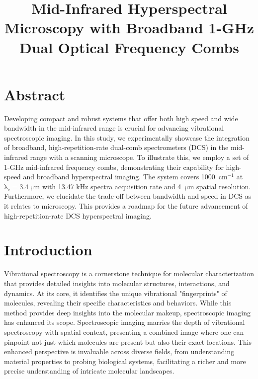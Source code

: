 \documentclass{optica-article}
\begin{document}
\title{Mid-Infrared Hyperspectral Microscopy with Broadband 1-GHz Dual Optical Frequency Combs}

\section{Abstract}
Developing compact and robust systems that offer both high speed and wide bandwidth in the mid-infrared range is crucial for advancing vibrational spectroscopic imaging. In this study, we experimentally showcase the integration of broadband, high-repetition-rate dual-comb spectrometers (DCS) in the mid-infrared range with a scanning microscope. To illustrate this, we employ a set of 1-GHz mid-infrared frequency combs, demonstrating their capability for high-speed and broadband hyperspectral imaging. The system covers \mbox{1000 $\mathrm{cm^{-1}}$} at \mbox{$\mathrm{\lambda_c=3.4 \; \mu m}$} with 13.47 kHz spectra acquisition rate and \mbox{4 $\mathrm{\mu m}$} spatial resolution. Furthermore, we elucidate the trade-off between bandwidth and speed in DCS as it relates to microscopy. This provides a roadmap for the future advancement of high-repetition-rate DCS hyperspectral imaging.


\section{Introduction}
Vibrational spectroscopy is a cornerstone technique for molecular characterization that provides detailed insights into molecular structures, interactions, and dynamics. At its core, it identifies the unique vibrational "fingerprints" of molecules, revealing their specific characteristics and behaviors. While this method provides deep insights into the molecular makeup, spectroscopic imaging has enhanced its scope. Spectroscopic imaging marries the depth of vibrational spectroscopy with spatial context, presenting a combined image where one can pinpoint not just which molecules are present but also their exact locations. This enhanced perspective is invaluable across diverse fields, from understanding material properties to probing biological systems, facilitating a richer and more precise understanding of intricate molecular landscapes.
\end{document}

